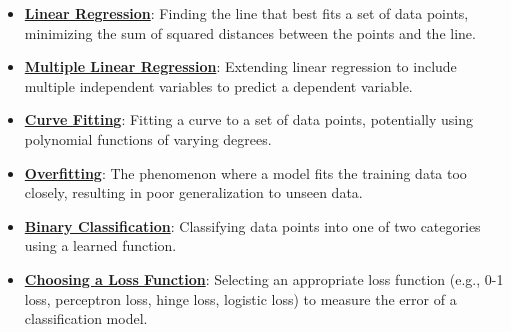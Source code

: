\documentclass{article}%
\begin{document}
\begin{itemize}[leftmargin=*]
\item \href{https://purdue.brightspace.com/d2l/common/assets/pdfjs-d2l-dist/1.0.14-legacy/web/viewer.html?file=%2Fcontent%2Fenforced%2F1095467-wl.202510.CS.24300.001%2F05L2-ML Basics.pdf%3Fou%3D1095467&lang=en-us&container=d2l-fileviewer-rendered-pdf&fullscreen=d2l-fileviewer-rendered-pdf-dialog&height=667#page=6}{\textbf{Linear Regression}}: Finding the line that best fits a set of data points, minimizing the sum of squared distances between the points and the line.%
\item \href{https://purdue.brightspace.com/d2l/common/assets/pdfjs-d2l-dist/1.0.14-legacy/web/viewer.html?file=%2Fcontent%2Fenforced%2F1095467-wl.202510.CS.24300.001%2F05L2-ML Basics.pdf%3Fou%3D1095467&lang=en-us&container=d2l-fileviewer-rendered-pdf&fullscreen=d2l-fileviewer-rendered-pdf-dialog&height=667#page=11}{\textbf{Multiple Linear Regression}}: Extending linear regression to include multiple independent variables to predict a dependent variable.%
\item \href{https://purdue.brightspace.com/d2l/common/assets/pdfjs-d2l-dist/1.0.14-legacy/web/viewer.html?file=%2Fcontent%2Fenforced%2F1095467-wl.202510.CS.24300.001%2F05L2-ML Basics.pdf%3Fou%3D1095467&lang=en-us&container=d2l-fileviewer-rendered-pdf&fullscreen=d2l-fileviewer-rendered-pdf-dialog&height=667#page=13}{\textbf{Curve Fitting}}: Fitting a curve to a set of data points, potentially using polynomial functions of varying degrees.%
\item \href{https://purdue.brightspace.com/d2l/common/assets/pdfjs-d2l-dist/1.0.14-legacy/web/viewer.html?file=%2Fcontent%2Fenforced%2F1095467-wl.202510.CS.24300.001%2F05L2-ML Basics.pdf%3Fou%3D1095467&lang=en-us&container=d2l-fileviewer-rendered-pdf&fullscreen=d2l-fileviewer-rendered-pdf-dialog&height=667#page=14}{\textbf{Overfitting}}: The phenomenon where a model fits the training data too closely, resulting in poor generalization to unseen data.%
\item \href{https://purdue.brightspace.com/d2l/common/assets/pdfjs-d2l-dist/1.0.14-legacy/web/viewer.html?file=%2Fcontent%2Fenforced%2F1095467-wl.202510.CS.24300.001%2F05L2-ML Basics.pdf%3Fou%3D1095467&lang=en-us&container=d2l-fileviewer-rendered-pdf&fullscreen=d2l-fileviewer-rendered-pdf-dialog&height=667#page=20}{\textbf{Binary Classification}}: Classifying data points into one of two categories using a learned function.%
\item \href{https://purdue.brightspace.com/d2l/common/assets/pdfjs-d2l-dist/1.0.14-legacy/web/viewer.html?file=%2Fcontent%2Fenforced%2F1095467-wl.202510.CS.24300.001%2F05L2-ML Basics.pdf%3Fou%3D1095467&lang=en-us&container=d2l-fileviewer-rendered-pdf&fullscreen=d2l-fileviewer-rendered-pdf-dialog&height=667#page=25}{\textbf{Choosing a Loss Function}}: Selecting an appropriate loss function (e.g., 0-1 loss, perceptron loss, hinge loss, logistic loss) to measure the error of a classification model.%

\end{itemize}
\end{document}
